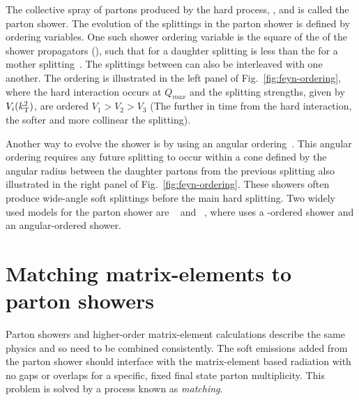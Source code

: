 The collective spray of partons produced by the hard process, \MPI{}, \ISR{} and \FSR{} is called the parton shower.
The evolution of the splittings in the parton shower is defined by ordering variables.
One such shower ordering variable is the square of the \pt{} of the shower propagators (\ktsq{}), such that \ktsq{} for a daughter splitting is less than the \ktsq{} for a mother splitting~\cite{Gen:kt}.
The splittings between \MPI{} can also be interleaved with one another.
The \ktsq{} ordering is illustrated in the left panel of Fig.~\ref{fig:feyn-ordering}, where the hard interaction occurs at $Q_{max}$ and the splitting strengths, given by $V_{i}(k_{\mathrm{T}}^2{})$, are ordered $V_{1} > V_{2} > V_{3}$ (The further in time from the hard interaction, the softer and more collinear the splitting). 

Another way to evolve the shower is by using an angular ordering~\cite{Gen:angular}.
This angular ordering requires any future splitting to occur within a cone defined by the angular radius between the daughter partons from the previous splitting also illustrated in the right panel of Fig.~\ref{fig:feyn-ordering}.
These showers often produce wide-angle soft splittings before the main hard splitting.
Two widely used models for the parton shower are \pythia{}~\cite{Gen:Pyth8p2} and \herwig{}~\cite{Gen:Herwigpp}, where \pythia{} uses a \ktsq{}-ordered shower and \herwig{} an angular-ordered shower.




\section{Matching matrix-elements to parton showers} %
\label{sec:matching_matrix_elements_to_parton_showers}

Parton showers and higher-order matrix-element calculations describe the same physics and so need to be combined consistently.
The soft emissions added from the parton shower should interface with the matrix-element based radiation with no gaps or overlaps for a specific, fixed final state parton multiplicity.
This problem is solved by a process known as \textit{matching}.

